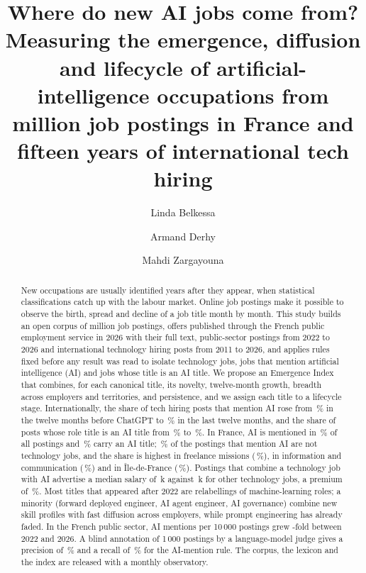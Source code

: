 \documentclass[5p,times,twocolumn,authoryear]{elsarticle}
\providecommand{\euro}{\texteuro}
\begin{document}
\begin{frontmatter}
\title{Where do new AI jobs come from? Measuring the emergence, diffusion and lifecycle of artificial-intelligence occupations from \nAll{} million job postings in France and fifteen years of international tech hiring}

\author[elia,eiffel]{Linda Belkessa}
\author[elia]{Armand Derhy}
\author[eiffel,elia]{Mahdi Zargayouna}

\begin{abstract}
New occupations are usually identified years after they appear, when statistical classifications catch up with the labour market. Online job postings make it possible to observe the birth, spread and decline of a job title month by month. This study builds an open corpus of \nAll{} million job postings, \nFT{} offers published through the French public employment service in 2026 with their full text, \nCSP{} public-sector postings from 2022 to 2026 and \nHN{} international technology hiring posts from 2011 to 2026, and applies rules fixed before any result was read to isolate technology jobs, jobs that mention artificial intelligence (AI) and jobs whose title is an AI title. We propose an Emergence Index that combines, for each canonical title, its novelty, twelve-month growth, breadth across employers and territories, and persistence, and we assign each title to a lifecycle stage. Internationally, the share of tech hiring posts that mention AI rose from \hnAIpre\,\% in the twelve months before ChatGPT to \hnAIlast\,\% in the last twelve months, and the share of posts whose role title is an AI title from \hnCorepre\,\% to \hnCorelast\,\%. In France, AI is mentioned in \pAI\,\% of all postings and \pCore\,\% carry an AI title; \pAIoutside\,\% of the postings that mention AI are not technology jobs, and the share is highest in freelance missions (\conLIB\,\%), in information and communication (\nafJ\,\%) and in \^Ile-de-France (\idfShare\,\%). Postings that combine a technology job with AI advertise a median salary of \salAItech\,k\euro{} against \salTech\,k\euro{} for other technology jobs, a premium of \salPremAItech\,\%. Most titles that appeared after 2022 are relabellings of machine-learning roles; a minority (forward deployed engineer, AI agent engineer, AI governance) combine new skill profiles with fast diffusion across employers, while prompt engineering has already faded. In the French public sector, AI mentions per 10\,000 postings grew \cspRatio-fold between 2022 and 2026. A blind annotation of 1\,000 postings by a language-model judge gives a precision of \precAiAny\,\% and a recall of \recAiAny\,\% for the AI-mention rule. The corpus, the lexicon and the index are released with a monthly observatory.
\end{abstract}


\end{frontmatter}
\end{document}
